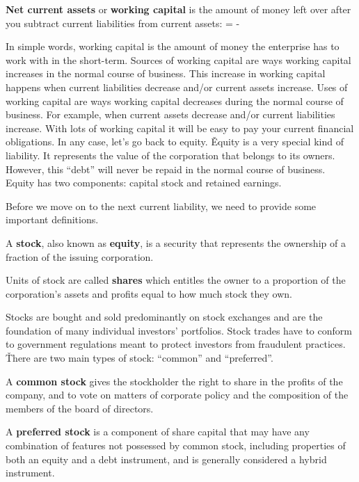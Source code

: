\textbf{Net current assets} or \textbf{working capital} is the amount of money left over after you subtract current
liabilities from current assets:
\bse
{} =  - 
\ese
\ed

In simple words, working capital is the amount of money the enterprise has to work with in the short-term. Sources of
working capital are ways working capital increases in the normal course of business. This increase in working capital
happens when current liabilities decrease and/or current assets increase. Uses of working capital are ways working
capital decreases during the normal course of business. For example, when current assets decrease and/or current
liabilities increase. With lots of working capital it will be easy to pay your current financial obligations. In any
case, let's go back to equity. \v

Equity is a very special kind of liability. It represents the value of the corporation that belongs to its owners.
However, this ``debt'' will never be repaid in the normal course of business. Equity has two components: capital
stock and retained earnings.

Before we move on to the next current liability, we need to provide some important definitions.

A \textbf{stock}, also known as \textbf{equity}, is a security that represents the ownership of a fraction of the
issuing corporation.
\ed

\bd[Share]
Units of stock are called \textbf{shares} which entitles the owner to a proportion of the corporation's
assets and profits equal to how much stock they own.
\ed

Stocks are bought and sold predominantly on stock exchanges and are the foundation of many individual investors'
portfolios. Stock trades have to conform to government regulations meant to protect investors from fraudulent practices.
\v

There are two main types of stock: ``common'' and ``preferred''.

A \textbf{common stock} gives the stockholder the right to share in the profits of the company, and to vote on matters
of corporate policy and the composition of the members of the board of directors.
\ed

A \textbf{preferred stock} is a component of share capital that may have any combination of features not possessed by
common stock, including properties of both an equity and a debt instrument, and is generally considered a hybrid
instrument.
\ed

